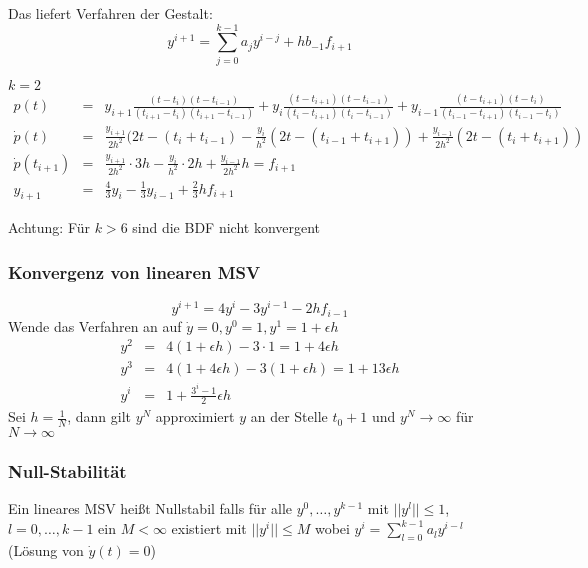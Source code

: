 Das liefert Verfahren der Gestalt:
$$y^{i+1}=\sum_{j=0}^{k-1}a_{j}y^{i-j}+hb_{-1}f_{i+1}$$

\begin{example}
$k=2$
\begin{eqnarray*}
	p(t)&=&y_{i+1}\frac{(t-t_{i})(t-t_{i-1})}{(t_{i+1}-t_{i})(t_{i+1}-t_{i-1})} + y_{i}\frac{(t-t_{i+1})(t-t_{i-1})}{(t_{i}-t_{i+1})(t_{i}-t_{i-1})}
	+y_{i-1}\frac{(t-t_{i+1})(t-t_{i})}{(t_{i-1}-t_{i+1})(t_{i-1}-t_{i})}\\
	\dot p(t)&=&\frac{y_{i+1}}{2h^{2}}(2t-(t_{i}+t_{i-1})-\frac{y_{i}}{h^{2}}(2t-(t_{i-1}+t_{i+1}))+\frac{y_{i-1}}{2h^{2}}(2t-(t_{i}+t_{i+1}))\\
	\dot p(t_{i+1})&=&\frac{y_{i+1}}{2h^{2}}\cdot 3h - \frac{y_{i}}{h^{2}}\cdot 2 h+\frac{y_{i-1}}{2h^{2}}h=f_{i+1}\\
	y_{i+1}&=&\frac{4}{3}y_{i}-\frac{1}{3}y_{i-1}+\frac{2}{3}hf_{i+1}	
\end{eqnarray*}
\end{example}

Achtung: Für $k>6$ sind die BDF nicht konvergent

\subsubsection{Konvergenz von linearen MSV}

\begin{example}
$$y^{i+1}=4y^{i}-3y^{i-1}-2hf_{i-1}$$
Wende das Verfahren an auf $\dot y =0,y^{0}=1,y^{1}=1+\epsilon h$
\begin{eqnarray*}
	y^{2}&=&4(1+\epsilon h)-3\cdot 1 = 1+4\epsilon h\\
	y^{3}&=&4(1+4\epsilon h)-3(1+\epsilon h) = 1+13\epsilon h\\
	y^{i}&=&1+\frac{3^{i}-1}{2}\epsilon h
\end{eqnarray*}
Sei $h=\frac{1}{N}$, dann gilt $y^{N}$ approximiert $y$ an der Stelle $t_{0}+1$ und $y^{N}\rightarrow \infty$ für $N\rightarrow \infty$
\end{example}

\subsubsection{Null-Stabilität}
\begin{definition}
	[Definition IV.8] Ein lineares MSV heißt Nullstabil falls für alle $y^{0},\ldots,y^{k-1}$ mit $||y^{l}||\le 1$, $l=0,\ldots,k-1$ ein
	$M<\infty$ existiert mit $||y^{i}||\le M$ wobei $y^{i}=\sum_{l=0}^{k-1}a_{l}y^{i-l}$ (Lösung von $\dot y(t)=0$)
\end{definition}

